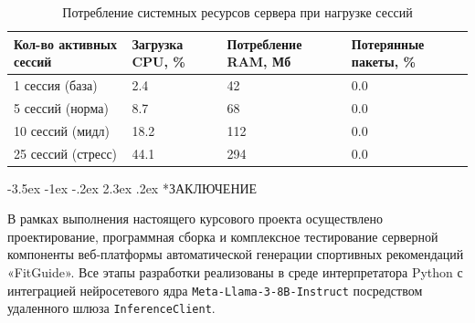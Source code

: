 \documentclass[14pt, a4paper]{extarticle}
\makeatletter
\renewcommand\section{\@startsection {section}{1}{\z@}%
                                   {-3.5ex \@plus -1ex \@minus -.2ex}%
                                   {2.3ex \@plus.2ex}%
                                   {\centering\normalfont\Large\bfseries}}
\makeatother
\begin{document}
\begin{table}[H]
\centering
\footnotesize
\caption{Потребление системных ресурсов сервера при нагрузке сессий}
\label{tab:ram_load}
\begin{tabular}{|p{4.2cm}|p{2.7cm}|p{3.4cm}|p{3.5cm}|}
\hline
\textbf{Кол-во активных сессий} & \textbf{Загрузка CPU, \%} & \textbf{Потребление RAM, Мб} & \textbf{Потерянные пакеты, \%} \\
\hline
1 сессия (база) & 2.4 & 42 & 0.0 \\
\hline
5 сессий (норма) & 8.7 & 68 & 0.0 \\
\hline
10 сессий (мидл) & 18.2 & 112 & 0.0 \\
\hline
25 сессий (стресс) & 44.1 & 294 & 0.0 \\
\hline
\end{tabular}
\end{table}




\newpage
\section*{ЗАКЛЮЧЕНИЕ}

В рамках выполнения настоящего курсового проекта осуществлено проектирование, программная сборка и комплексное тестирование серверной компоненты веб-платформы автоматической генерации спортивных рекомендаций «FitGuide». Все этапы разработки реализованы в среде интерпретатора Python с интеграцией нейросетевого ядра \texttt{Meta-Llama-3-8B-Instruct} посредством удаленного шлюза \texttt{InferenceClient}.
\end{document}

